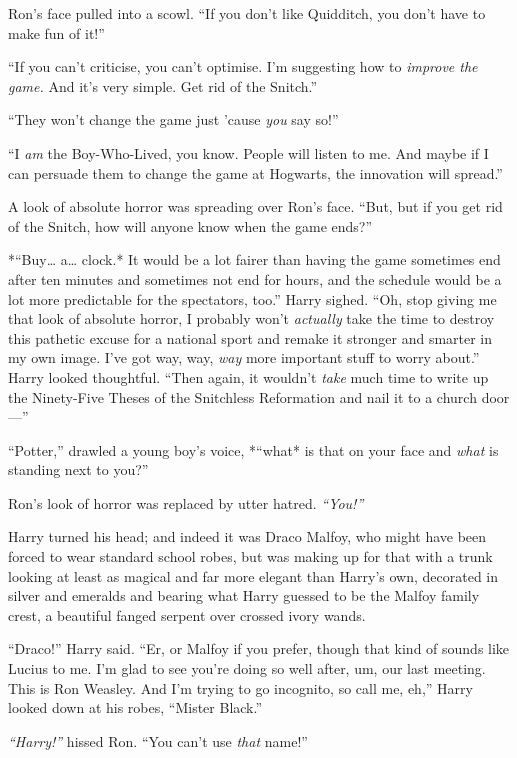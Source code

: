Ron's face pulled into a scowl. ``If you don't like Quidditch, you don't
have to make fun of it!''

``If you can't criticise, you can't optimise. I'm suggesting how to
\emph{improve the game.} And it's very simple. Get rid of the Snitch.''

``They won't change the game just 'cause \emph{you} say so!''

``I \emph{am} the Boy-Who-Lived, you know. People will listen to me. And
maybe if I can persuade them to change the game at Hogwarts, the
innovation will spread.''

A look of absolute horror was spreading over Ron's face. ``But, but if
you get rid of the Snitch, how will anyone know when the game ends?''

*``Buy\ldots{} a\ldots{} clock.* It would be a lot fairer than having
the game sometimes end after ten minutes and sometimes not end for
hours, and the schedule would be a lot more predictable for the
spectators, too.'' Harry sighed. ``Oh, stop giving me that look of
absolute horror, I probably won't \emph{actually} take the time to
destroy this pathetic excuse for a national sport and remake it stronger
and smarter in my own image. I've got way, way, \emph{way} more
important stuff to worry about.'' Harry looked thoughtful. ``Then again,
it wouldn't \emph{take} much time to write up the Ninety-Five Theses of
the Snitchless Reformation and nail it to a church door---''

``Potter,'' drawled a young boy's voice, *``what* is that on your face
and \emph{what} is standing next to you?''

Ron's look of horror was replaced by utter hatred. \emph{``You!''}

Harry turned his head; and indeed it was Draco Malfoy, who might have
been forced to wear standard school robes, but was making up for that
with a trunk looking at least as magical and far more elegant than
Harry's own, decorated in silver and emeralds and bearing what Harry
guessed to be the Malfoy family crest, a beautiful fanged serpent over
crossed ivory wands.

``Draco!'' Harry said. ``Er, or Malfoy if you prefer, though that kind
of sounds like Lucius to me. I'm glad to see you're doing so well after,
um, our last meeting. This is Ron Weasley. And I'm trying to go
incognito, so call me, eh,'' Harry looked down at his robes, ``Mister
Black.''

\emph{``Harry!''} hissed Ron. ``You can't use \emph{that} name!''

